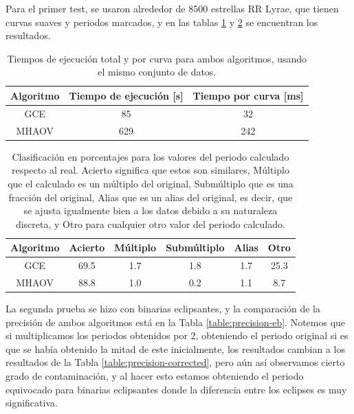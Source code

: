 Para el primer test, se usaron alrededor de 8500 estrellas RR Lyrae, que tienen curvas suaves y periodos marcados, y en las tablas \ref{table:tiempos-rrl} y \ref{table:precision-rrl} se encuentran los resultados.
\begin{table}[H]
\caption{Tiempos de ejecución total y por curva para ambos algoritmos, usando el mismo conjunto de datos.}
    \begin{tabular}{|c|c|c|}
    \hline
    Algoritmo & Tiempo de ejecución {[}s{]} & Tiempo por curva {[}ms{]} \\ \hline
    GCE       & 85                          & 32                        \\ \hline
    MHAOV     & 629                         & 242                       \\ \hline
    \end{tabular}
    \label{table:tiempos-rrl}
\end{table}

\begin{table}[H]
\caption{Clasificación en porcentajes para los valores del periodo calculado respecto al real. Acierto significa que estos son similares, Múltiplo que el calculado es un múltiplo del original, Submúltiplo que es una fracción del original, Alias que es un alias del original, es decir, que se ajusta igualmente bien a los datos debido a su naturaleza discreta, y Otro para cualquier otro valor del periodo calculado.}
\begin{tabular}{|c|c|c|c|c|c|}
    \hline
    Algoritmo & Acierto & Múltiplo & Submúltiplo & Alias & Otro \\ \hline
    GCE       & 69.5  & 1.7      & 1.8         & 1.7   & 25.3  \\ \hline
    MHAOV     & 88.8  & 1.0      & 0.2         & 1.1   & 8.7   \\ \hline
    \end{tabular}
    \label{table:precision-rrl}
\end{table}
La segunda prueba se hizo con binarias eclipsantes, y la comparación de la precisión de ambos algoritmos está en la Tabla \ref{table:precision-eb}. Notemos que si multiplicamos los periodos obtenidos por $2$, obteniendo el periodo original si es que se había obtenido la mitad de este inicialmente, los resultados cambian a los resultados de la Tabla \ref{table:precision-corrected}, pero aún así observamos cierto grado de contaminación, y al hacer esto estamos obteniendo el periodo equivocado para binarias eclipsantes donde la diferencia entre los eclipses es muy significativa.


